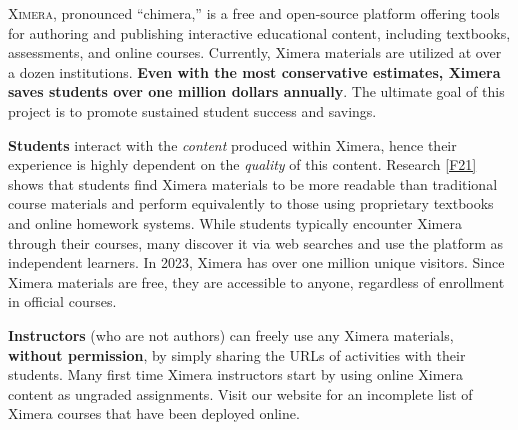 \documentclass[twocolumn]{article}
\begin{document}
\pagestyle{main}
\thispagestyle{title}
\noindent
\lettrine[lines=2]{X}{imera}, pronounced ``chimera,'' is a free and
open-source platform offering tools for authoring and publishing
interactive educational content, including textbooks, assessments, and
online
courses. Currently, Ximera materials are utilized at over a dozen
institutions. \textbf{Even with the most conservative estimates, Ximera saves
    students
    over one million dollars annually}. The ultimate goal of this project is to
promote sustained student success and savings.

\vspace{.2cm}

\begin{xframe}
    {\sffamily\bfseries Students} interact with the \textit{content} produced within
    Ximera, hence their experience is highly dependent on the \textit{quality} of this
    content. Research \ref{F21} shows that students find Ximera materials to be more readable
    than traditional course materials and perform equivalently to those using
    proprietary textbooks and online homework systems. While students typically
    encounter Ximera through their courses, many discover it via web searches and
    use the platform as independent learners. In 2023, Ximera has over one million
    unique visitors. Since Ximera materials are free, they are accessible to
    anyone, regardless of enrollment in official courses.
\end{xframe}
\begin{xframe}
    {\sffamily\bfseries Instructors} (who are not authors) can freely use
    any Ximera materials,
    \textbf{without permission}, by simply sharing the URLs of activities
    with their students. Many first time Ximera instructors start  by
    using online Ximera content as
    ungraded assignments. Visit our website for an incomplete list of
    Ximera courses that have been deployed online.
\end{xframe}
\end{document}

